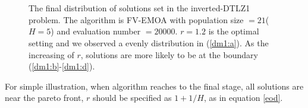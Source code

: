 \documentclass[conference]{IEEEtran}
\begin{document}
\begin{figure}[!t]
  \centering
  \quad
  \\
  \quad
  \\
  \caption{The final distribution of solutions set in the inverted-DTLZ1 problem.
  The algorithm is FV-EMOA with population size $=21$($H=5$) and evaluation number $=20000$.
  $r=1.2$ is the optimal setting and we observed a evenly distribution in (\ref{dm1:a}).
  As the increasing of $r$, solutions are more likely to be at the boundary
  (\ref{dm1:b}-\ref{dm1:d}). 
  }
  \label{dm1}
\end{figure}

For simple illustration,
when algorithm reaches to the final stage, all solutions are near the pareto front, $r$ should
be specified as $1+1/H$, as in equation \ref{eod}. 
\end{document}
